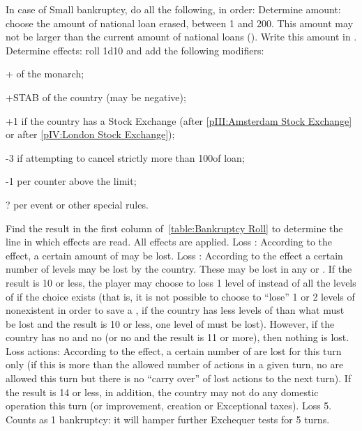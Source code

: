  In case of Small bankruptcy, do all the following,
in order:
\bparag Determine amount: choose the amount of national loan erased, between 1
and 200\ducats. This amount may not be larger than the current amount of
national loans (). Write this amount in
.
\bparag Determine effects: roll 1d10 and add the following modifiers:
\begin{modlist}
\item[+\ADM] \ADM of the monarch;
\item[+STAB] \STAB of the country (may be negative);
\item[+1] if the country has a Stock Exchange (\HOL after \ref{pIII:Amsterdam
    Stock Exchange} or \ANG after \ref{pIV:London Stock Exchange});
\item[-3] if attempting to cancel strictly more than 100\ducats of loan;
\item[-1] per \MNU counter above the limit;
\item[\textplusminus?] per event or other special rules.
\end{modlist}
Find the result in the first column of~\ref{table:Bankruptcy Roll} to
determine the line in which effects are read. All effects are applied.
\bparag Loss \STAB: According to the effect, a certain amount of \STAB may be
lost.
\bparag Loss \TradeFLEET: According to the effect a certain number of
\TradeFLEET levels may be lost by the country. These may be lost in any \STZ
or \CTZ. If the result is 10 or less, the player may choose to loss 1 level of
\MNU instead of all the levels of \TradeFLEET if the choice exists (that is,
it is not possible to choose to ``lose'' 1 or 2 levels of nonexistent
\TradeFLEET in order to save a \MNU, if the country has less levels of
\TradeFLEET than what must be lost and the result is 10 or less, one level of
\MNU must be lost). However, if the country has no \TradeFLEET and no \MNU (or
no \TradeFLEET and the result is 11 or more), then nothing is lost.
\bparag Loss actions: According to the effect, a certain number of \TFI are
lost for this turn only (if this is more than the allowed number of actions in
a given turn, no \TFI are allowed this turn but there is no ``carry over'' of
lost actions to the next turn). If the result is 14 or less, in addition, the
country may not do any domestic operation this turn (\DTI or \FTI improvement,
\MNU creation or Exceptional taxes).
\bparag Loss 5\VPs.
\bparag Counts as 1 bankruptcy: it will hamper further Exchequer tests for 5
turns.

